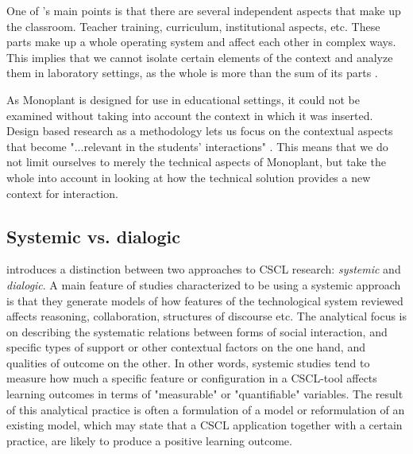 One of \citeauthor{brown1992design}'s main points is that there are several independent aspects that make up the classroom. Teacher training, curriculum, institutional aspects, etc. These parts make up a whole operating system and affect each other in complex ways. This implies that we cannot isolate certain elements of the context and analyze them in laboratory settings, as the whole is more than the sum of its parts \citep{brown1992design}.


As Monoplant is designed for use in educational settings, it could not be examined without taking into account the context in which it was inserted. Design based research as a methodology lets us focus on the contextual aspects that become "...relevant in the students' interactions" \citep{krange2009historical}. This means that we do not limit ourselves to merely the technical aspects of Monoplant, but take the whole into account in looking at how the technical solution provides a new context for interaction. 

\subsection{Systemic vs. dialogic}
\citet{arnseth2006approaching} introduces a distinction between two approaches to CSCL research: \emph{systemic} and \emph{dialogic}. A main feature of studies characterized to be using a systemic approach is that they generate models of how features of the technological system reviewed affects reasoning, collaboration, structures of discourse etc. The analytical focus is on describing the systematic relations between forms of social interaction, and specific types of support or other contextual factors on the one hand, and qualities of outcome on the other. \citep{arnseth2006approaching} In other words, systemic studies tend to measure how much a specific feature or configuration in a CSCL-tool affects learning outcomes in terms of "measurable" or "quantifiable" variables. The result of this analytical practice is often a formulation of a model or reformulation of an existing model, which may state that a CSCL application together with a certain practice, are likely to produce a positive learning outcome.

